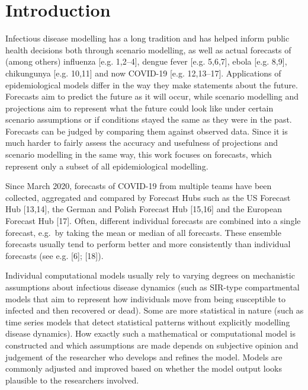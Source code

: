 \documentclass[10pt,letterpaper]{article}
\begin{document}
\linenumbers

\hypertarget{introduction}{%
\section{Introduction}\label{introduction}}

Infectious disease modelling has a long tradition and has helped inform
public health decisions both through scenario modelling, as well as
actual forecasts of (among others) influenza {[}e.g. 1,2--4{]}, dengue
fever {[}e.g. 5,6,7{]}, ebola {[}e.g. 8,9{]}, chikungunya {[}e.g.
10,11{]} and now COVID-19 {[}e.g. 12,13--17{]}. Applications of
epidemiological models differ in the way they make statements about the
future. Forecasts aim to predict the future as it will occur, while
scenario modelling and projections aim to represent what the future
could look like under certain scenario assumptions or if conditions
stayed the same as they were in the past. Forecasts can be judged by
comparing them against observed data. Since it is much harder to fairly
assess the accuracy and usefulness of projections and scenario modelling
in the same way, this work focuses on forecasts, which represent only a
subset of all epidemiological modelling.

Since March 2020, forecasts of COVID-19 from multiple teams have been
collected, aggregated and compared by Forecast Hubs such as the US
Forecast Hub {[}13,14{]}, the German and Polish Forecast Hub {[}15,16{]}
and the European Forecast Hub {[}17{]}. Often, different individual
forecasts are combined into a single forecast, e.g.~by taking the mean
or median of all forecasts. These ensemble forecasts usually tend to
perform better and more consistently than individual forecasts (see e.g.
{[}6{]}; {[}18{]}).

Individual computational models usually rely to varying degrees on
mechanistic assumptions about infectious disease dynamics (such as
SIR-type compartmental models that aim to represent how individuals move
from being susceptible to infected and then recovered or dead). Some are
more statistical in nature (such as time series models that detect
statistical patterns without explicitly modelling disease dynamics). How
exactly such a mathematical or computational model is constructed and
which assumptions are made depends on subjective opinion and judgement
of the researcher who develops and refines the model. Models are
commonly adjusted and improved based on whether the model output looks
plausible to the researchers involved.
\end{document}
